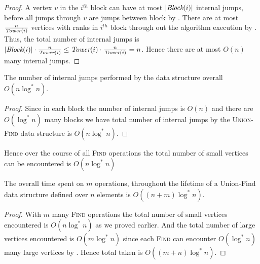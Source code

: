 \begin{proof}
	A vertex $v$ in the $i^{th}$ block can have at most $|\emph{Block}(i)|$ internal jumps, before all jumps through $v$ are jumps between block by . There are at most $\frac{n}{\emph{Tower}(i)}$ vertices with ranks in $i^{th}$ block through out the algorithm execution by . Thus, the total number of internal jumps is $|\emph{Block}(i)|\cdot\frac{n}{\emph{Tower}(i)}\leq \emph{Tower}(i)\cdot \frac{n}{\emph{Tower}(i)}=n$. Hence there are at most $O(n)$ many internal jumps.
\end{proof}

\begin{Theorem}{}{}
	The number of internal jumps performed by the  data structure overall $O(n\log^*n)$.
\end{Theorem}
\begin{proof}
	Since in each block the number of internal jumps is $O(n)$ and there are $O(\log^*n)$ many blocks we have total number of internal jumps by the \textsc{Union-Find} data structure is $O(n\log^*n)$.
\end{proof}
Hence over the course of all \textsc{Find} operations the total number of small vertices can be encountered is $O(n\log^*n)$
\begin{Theorem}{}{}
	The overall time spent on $m$  operations, throughout the lifetime of a Union-Find data structure defined over $n$ elements is $O((n+m)\log^*n)$.
\end{Theorem}
\begin{proof}
	With $m$ many \textsc{Find} operations the total number of small vertices encountered is $O(n\log^*n)$ as we proved earlier. And the total number of large vertices encountered is $O(m\log ^*n)$ since each \textsc{Find} can encounter $O(\log^*n)$ many large vertices by . Hence total taken is $O((m+n)\log^*n)$.
\end{proof}